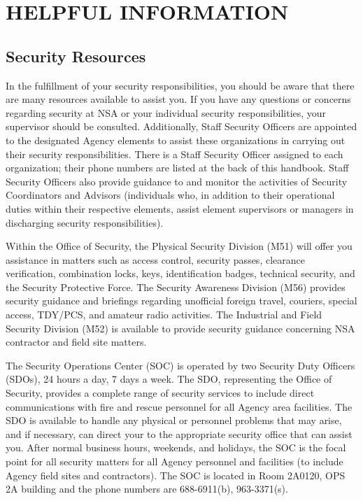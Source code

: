 \documentclass[a4]{article}
\begin{document}
\section{HELPFUL INFORMATION}

\subsection{Security Resources}

In the fulfillment of your security responsibilities, you should be aware that
there are many resources available to assist you.  If you have any questions or
concerns regarding security at NSA or your individual security
responsibilities, your supervisor should be consulted.  Additionally, Staff
Security Officers are appointed to the designated Agency elements to assist
these organizations in carrying out their security responsibilities.  There is
a Staff Security Officer assigned to each organization; their phone numbers are
listed at the back of this handbook.  Staff Security Officers also provide
guidance to and monitor the activities of Security Coordinators and Advisors
(individuals who, in addition to their operational duties within their
respective elements, assist element supervisors or managers in discharging
security responsibilities).

Within the Office of Security, the Physical Security Division (M51) will offer
you assistance in matters such as access control, security passes, clearance
verification, combination locks, keys, identification badges, technical
security, and the Security Protective Force.  The Security Awareness Division
(M56) provides security guidance and briefings regarding unofficial foreign
travel, couriers, special access, TDY/PCS, and amateur radio activities.  The
Industrial and Field Security Division (M52) is available to provide security
guidance concerning NSA contractor and field site matters.

The Security Operations Center (SOC) is operated by two Security Duty Officers
(SDOs), 24 hours a day, 7 days a week.  The SDO, representing the Office of
Security, provides a complete range of security services to include direct
communications with fire and rescue personnel for all Agency area facilities.
The SDO is available to handle any physical or personnel problems that may
arise, and if necessary, can direct your to the appropriate security office
that can assist you.  After normal business hours, weekends, and holidays, the
SOC is the focal point for all security matters for all Agency personnel and
facilities (to include Agency field sites and contractors).  The SOC is located
in Room 2A0120, OPS 2A building and the phone numbers are 688-6911(b),
963-3371(s).
\end{document}
